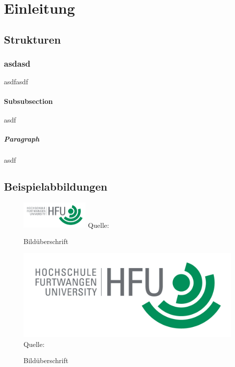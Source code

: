\chapter{Einleitung}

\section{Strukturen}

\subsection{asdasd}
asdfasdf

\subsubsection{Subsubsection}
asdf

\paragraph{Paragraph}
asdf

\section{Beispielabbildungen}

\lipsum[10]

\begin{figure}
\caption{Bildüberschrift}
\centering
\includegraphics[width=0.3\textwidth]{pictures/hfu.jpg}
Quelle: \cite{ParquetStats}
\label{pic:bild2}
\end{figure}

\lipsum[10]

\begin{figure}
\caption{Bildüberschrift}
\includegraphics[width=1\textwidth]{pictures/hfu.jpg}
Quelle: \cite{ParquetStats}
\label{pic:bild1}
\end{figure}

